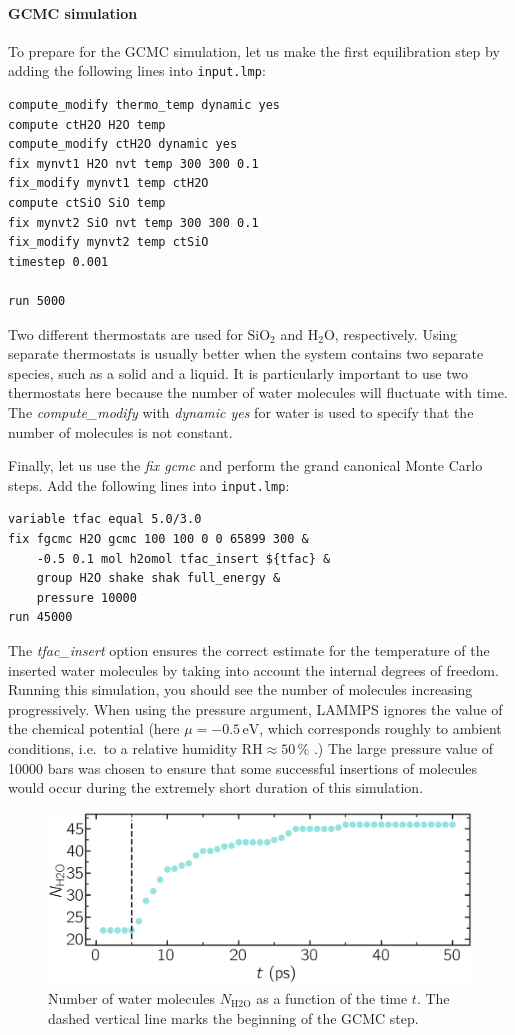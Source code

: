 \documentclass[9pt,tutorial]{livecoms}
\newcommand{\flecmd}[1]{\textcolor{command}{\texttt{#1}}} %
\begin{document}
\paragraph{GCMC simulation}
To prepare for the GCMC simulation, let us make the first equilibration step by
adding the following lines into \flecmd{input.lmp}:
\begin{lstlisting}
compute_modify thermo_temp dynamic yes
compute ctH2O H2O temp
compute_modify ctH2O dynamic yes
fix mynvt1 H2O nvt temp 300 300 0.1
fix_modify mynvt1 temp ctH2O
compute ctSiO SiO temp
fix mynvt2 SiO nvt temp 300 300 0.1
fix_modify mynvt2 temp ctSiO
timestep 0.001

run 5000
\end{lstlisting}
Two different thermostats are used for $\text{SiO}_2$ and $\text{H}_2\text{O}$,
respectively. Using separate thermostats is usually better when the system contains
two separate species, such as a solid and a liquid. It is particularly important
to use two thermostats here because the number of water molecules will fluctuate
with time. The \textit{compute\_modify} with \textit{dynamic yes} for water is
used to specify that the number of molecules is not constant.

Finally, let us use the \textit{fix gcmc} and perform the grand canonical Monte
Carlo steps. Add the following lines into \flecmd{input.lmp}:
\begin{lstlisting}
variable tfac equal 5.0/3.0
fix fgcmc H2O gcmc 100 100 0 0 65899 300 &
    -0.5 0.1 mol h2omol tfac_insert ${tfac} &
    group H2O shake shak full_energy &
    pressure 10000
run 45000
\end{lstlisting}
The \textit{tfac\_insert} option ensures the correct estimate for the temperature
of the inserted water molecules by taking into account the internal degrees of
freedom. Running this simulation, you should see the number of molecules increasing
progressively. When using the pressure argument, LAMMPS ignores the value of the
chemical potential (here $\mu = -0.5\,\text{eV}$, which corresponds roughly to
ambient conditions, i.e.~to a relative humidity $\text{RH} \approx 50\,\%$ \cite{gravelle2020multi}.)
The large pressure value of 10000 bars was chosen to ensure that some successful
insertions of molecules would occur during the extremely short duration of this simulation.

\begin{figure}
\centering
\includegraphics[width=\linewidth]{GCMC-number}
\caption{Number of water molecules $N_\text{H2O}$ as a function of the time $t$.
The dashed vertical line marks the beginning of the GCMC step.}
\label{fig:GCMC-number}
\end{figure}
\end{document}
